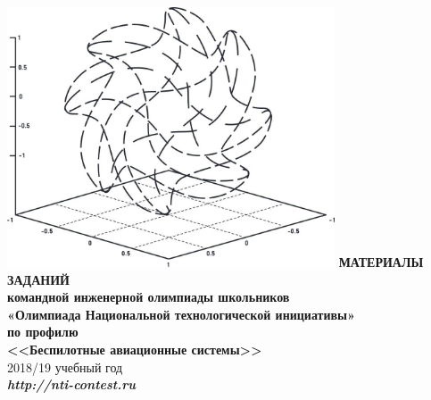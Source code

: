 \begin{titlepage}
    \begin{center}
        \includegraphics[width=9.71cm]{title}
        \vspace{1cm}
        \fontsize{15}{0.7cm}\textbf{МАТЕРИАЛЫ ЗАДАНИЙ}\\
        \vspace{0.2cm}
        \fontsize{15}{0.7cm}\textbf{командной инженерной олимпиады школьников}\\
        \vspace{0.2cm}
        \fontsize{15}{0.7cm}\textbf{«Олимпиада Национальной технологической инициативы»}\\
        \vspace{0.5cm}
        \fontsize{15}{0.7cm}\textbf{по профилю}\\
        \vspace{0.2cm}
        \fontsize{15}{0.7cm}\textbf{<<Беспилотные авиационные системы>>}\\
        \vspace{1.5cm}
        \fontsize{15}{0}2018/19 учебный год\\
        \vspace{9cm}
        \fontsize{15}{0}\textit{\textbf{http://nti-contest.ru}}
    \end{center}
\end{titlepage}